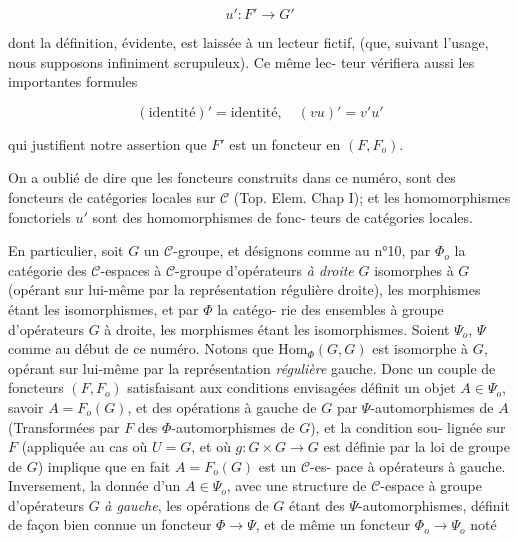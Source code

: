 \newpage



$$u' : F' \longrightarrow G'$$

dont la définition, évidente, est laissée à un lecteur fictif, (que,
suivant l'usage, nous supposons infiniment scrupuleux). Ce même lec-
teur vérifiera aussi les importantes formules

$$(\mathrm{identité})' = \mathrm{identité}, \quad (vu)' = v'u'$$

qui justifient notre assertion que $F'$ est un foncteur en $(F, F_o)$.

On a oublié de dire que les foncteurs construits dans ce numéro,
sont des foncteurs de catégories locales sur $\mathcal{C}$ (Top. Elem. Chap I);
et les homomorphismes fonctoriels $u'$ sont des homomorphismes de fonc-
teurs de catégories locales.

En particulier, soit $G$ un $\mathcal{C}$-groupe, et désignons comme au n°10,
par $\Phi_o$ la catégorie des $\mathcal{C}$-espaces à $\mathcal{C}$-groupe d'opérateurs \emph{à droite}
$G$ isomorphes à $G$ (opérant sur lui-même par la représentation régulière
droite), les morphismes étant les isomorphismes, et par $\Phi$ la catégo-
rie des ensembles à groupe d'opérateurs $G$ à droite, les morphismes
étant les isomorphismes. Soient $\Psi_o$, $\Psi$ comme au début de ce numéro.
Notons que $\mathrm{Hom}_{\Phi}(G,G)$ est isomorphe à $G$, opérant sur lui-même par la
représentation \emph{régulière} gauche. Donc un couple de foncteurs $(F, F_o)$
satisfaisant aux conditions envisagées définit un objet $A \in \Psi_o$, savoir
$A = F_o(G)$, et des opérations à gauche de $G$ par $\Psi$-automorphismes de $A$
(Transformées par $F$ des $\Phi$-automorphismes de $G$), et la condition sou-
lignée sur $F$ (appliquée au cas où $U=G$, et où $g : G \times G \to G$ est définie
par la loi de groupe de $G$) implique que en fait $A = F_o(G)$ est un $\mathcal{C}$-es-
pace à opérateurs à gauche. Inversement, la donnée d'un $A \in \Psi_o$, avec
une structure de $\mathcal{C}$-espace à groupe d'opérateurs $G$ \emph{à gauche}, les
opérations de $G$ étant des $\Psi$-automorphismes, définit de façon bien
connue un foncteur $\Phi \to \Psi$, et de même un foncteur $\Phi_o \to \Psi_o$ noté

\newpage



